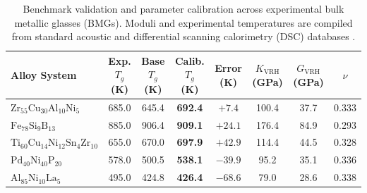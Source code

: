 \documentclass[aps,prmaterials,reprint,superscriptaddress,amsmath,amssymb,floatfix]{revtex4-2}
\begin{document}
\begin{table}[t]
\caption{\label{tab:calibration}Benchmark validation and parameter calibration across experimental bulk metallic glasses (BMGs). Moduli and experimental temperatures are compiled from standard acoustic and differential scanning calorimetry (DSC) databases \cite{Wang2004BMG,Inoue2000Acta,Nishiyama2002PdNiP,Wilde2000PdNiP,Inoue1989AlNiLa,YeLu2005AlNiLa,Zhang2007TiBMG,Zhu2008TiCPS,Luborsky1983,Davis1978Metglas}.}
\begin{ruledtabular}
\begin{tabular}{l c c c c c c c}
Alloy System & Exp. $T_g$ (K) \cite{Wang2004BMG} & Base $T_g$ (K) \cite{Johnson2005} & Calib. $T_g$ (K) & Error (K) & $K_{\text{VRH}}$ (GPa) \cite{Wang2004BMG} & $G_{\text{VRH}}$ (GPa) \cite{Wang2004BMG} & $\nu$ \cite{Wang2004BMG} \\
\hline
$\text{Zr}_{55}\text{Cu}_{30}\text{Al}_{10}\text{Ni}_5$ & 685.0 & 645.4 & \textbf{692.4} & $+7.4$ & 100.4 & 37.7 & 0.333 \\
$\text{Fe}_{78}\text{Si}_9\text{B}_{13}$ & 885.0 & 906.4 & \textbf{909.1} & $+24.1$ & 176.4 & 84.9 & 0.293 \\
$\text{Ti}_{60}\text{Cu}_{14}\text{Ni}_{12}\text{Sn}_4\text{Zr}_{10}$ & 655.0 & 670.0 & \textbf{697.9} & $+42.9$ & 114.4 & 44.5 & 0.328 \\
$\text{Pd}_{40}\text{Ni}_{40}\text{P}_{20}$ & 578.0 & 500.5 & \textbf{538.1} & $-39.9$ & 95.2 & 35.1 & 0.336 \\
$\text{Al}_{85}\text{Ni}_{10}\text{La}_5$ & 495.0 & 424.8 & \textbf{426.4} & $-68.6$ & 79.0 & 28.6 & 0.338 \\
\end{tabular}
\end{ruledtabular}
\end{table}
\end{document}
